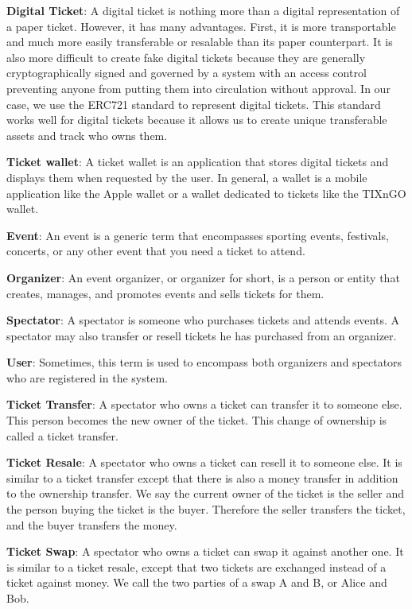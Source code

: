 \documentclass[a4paper,11pt,oneside]{report}
\begin{document}
\begin{description} 
    \item \textbf{Digital Ticket}: A digital ticket is nothing more than a digital representation of a paper ticket. However, it has many advantages. First, it is more transportable and much more easily transferable or resalable than its paper counterpart. It is also more difficult to create fake digital tickets because they are generally cryptographically signed and governed by a system with an access control preventing anyone from putting them into circulation without approval. In our case, we use the ERC721 standard to represent digital tickets. This standard works well for digital tickets because it allows us to create unique transferable assets and track who owns them.
    \item \textbf{Ticket wallet}: A ticket wallet is an application that stores digital tickets and displays them when requested by the user. In general, a wallet is a mobile application like the Apple wallet or a wallet dedicated to tickets like the TIXnGO wallet.
    \item \textbf{Event}: An event is a generic term that encompasses sporting events, festivals, concerts, or any other event that you need a ticket to attend.
    \item \textbf{Organizer}: An event organizer, or organizer for short, is a person or entity that creates, manages, and promotes events and sells tickets for them.
    \item \textbf{Spectator}: A spectator is someone who purchases tickets and attends events. A spectator may also transfer or resell tickets he has purchased from an organizer.
    \item \textbf{User}: Sometimes, this term is used to encompass both organizers and spectators who are registered in the system.
    \item \textbf{Ticket Transfer}: A spectator who owns a ticket can transfer it to someone else. This person becomes the new owner of the ticket. This change of ownership is called a ticket transfer.
    \item \textbf{Ticket Resale}: A spectator who owns a ticket can resell it to someone else. It is similar to a ticket transfer except that there is also a money transfer in addition to the ownership transfer. We say the current owner of the ticket is the seller and the person buying the ticket is the buyer. Therefore the seller transfers the ticket, and the buyer transfers the money.
    \item \textbf{Ticket Swap}: A spectator who owns a ticket can swap it against another one. It is similar to a ticket resale, except that two tickets are exchanged instead of a ticket against money. We call the two parties of a swap A and B, or Alice and Bob.

\end{description}
\end{document}
